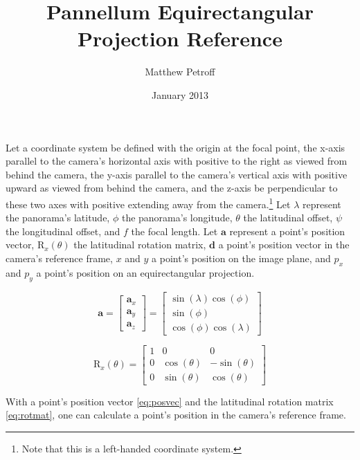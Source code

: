 \documentclass[letterpaper,10pt]{article}
\begin{document}
\title{Pannellum Equirectangular Projection Reference}
\author{Matthew Petroff}
\date{January 2013}
\maketitle 

Let a coordinate system be defined with the origin at the focal point, the
x-axis parallel to the camera's horizontal axis with positive to the right as
viewed from behind the camera, the y-axis parallel to the camera's vertical
axis with positive upward as viewed from behind the camera, and the z-axis be
perpendicular to these two axes with positive extending away from the
camera.\footnote{Note that this is a left-handed coordinate system.}
Let \(\lambda\) represent the panorama's latitude, \(\phi\) the panorama's
longitude, \(\theta\) the latitudinal offset, \(\psi\) the longitudinal offset,
and \(f\) the focal length. Let \(\mathbf{a}\) represent a point's position
vector, \(\mathrm{R}_x(\theta)\) the latitudinal rotation matrix,
\(\mathbf{d}\) a point's position vector in the camera's reference frame, \(x\)
and \(y\) a point's position on the image plane, and \(p_x\) and \(p_y\) a
point's position on an equirectangular projection.

\begin{equation} \label{eq:posvec}
\mathbf{a} = \begin{bmatrix}
\mathbf{a}_x \\ \mathbf{a}_y \\ \mathbf{a}_z
\end{bmatrix} = \begin{bmatrix}
\sin(\lambda)\cos(\phi) \\ \sin(\phi) \\ \cos(\phi)\cos(\lambda) \end{bmatrix}
\end{equation}

\begin{equation}  \label{eq:rotmat}
\mathrm{R}_x(\theta) = \begin{bmatrix}
1 & 0 & 0 \\
0 & \cos(\theta) & -\sin(\theta) \\
0 & \sin(\theta) & \cos(\theta)
\end{bmatrix}
\end{equation}

With a point's position vector \eqref{eq:posvec} and the latitudinal rotation
matrix \eqref{eq:rotmat}, one can calculate a point's position in the camera's
reference frame.\nopagebreak
\end{document}
